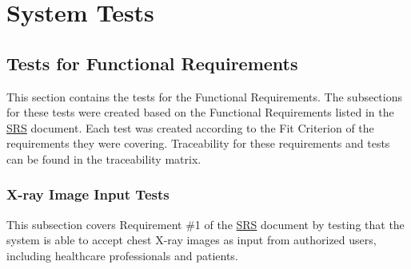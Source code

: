 \documentclass[12pt, titlepage]{article}
\begin{document}
\section{System Tests}

\subsection{Tests for Functional Requirements}

This section contains the tests for the Functional Requirements. The subsections for these tests were created based on the Functional Requirements listed in the \href{https://github.com/RezaJodeiri/CXR-Capstone/blob/main/docs/SRS/SRS.pdf}{SRS} \citep{SRS}
 document. Each test was created according to the Fit Criterion of the requirements they were covering. Traceability for these requirements and tests can be found in the traceability matrix.

\subsubsection{X-ray Image Input Tests}

This subsection covers Requirement \#1 of the \href{https://github.com/RezaJodeiri/CXR-Capstone/blob/main/docs/SRS/SRS.pdf}{SRS} \citep{SRS}
document by testing that the system is able to accept chest X-ray images as input from authorized users, including healthcare professionals and patients.
\end{document}
